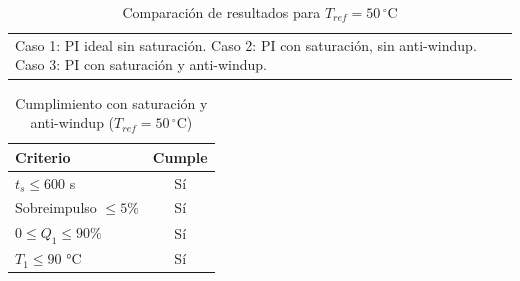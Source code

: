 \documentclass[journal]{IEEEtran}
\begin{document}
\begin{table}[h!]
\centering
\caption{Comparación de resultados para $T_{ref} = 50\,^\circ$C}
\label{tab:comparacion_50}
\footnotesize
\vspace{2pt}
\begin{tabular}{@{}p{}@{}}
Caso 1: PI ideal sin saturación. \quad
Caso 2: PI con saturación, sin anti-windup. \quad
Caso 3: PI con saturación y anti-windup.
\end{tabular}
\end{table}

\begin{table}[h!]
\centering
\caption{Cumplimiento con saturación y anti-windup ($T_{ref} = 50\,^\circ$C)}
\label{tab:cumplimiento_50}
\footnotesize
\begin{tabular}{lc}
\hline
\textbf{Criterio} & \textbf{Cumple} \\
\hline
$t_s \leq 600$ s        & Sí \\
Sobreimpulso $\leq 5\%$ & Sí \\
$0 \leq Q_1 \leq 90\%$  & Sí \\
$T_1 \leq 90$ °C        & Sí \\
\hline
\end{tabular}
\end{table}
\end{document}
